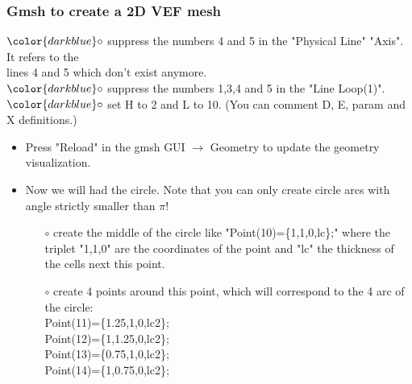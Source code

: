 \documentclass[10pt]{beamer}
\begin{document}
\begin{frame}
\frametitle{Gmsh to create a 2D VEF mesh}
\begin{block}{}

\hspace{1cm} $\color{darkblue}\circ$ {\small{ suppress the numbers 4 and 5 in the "Physical Line" "Axis". It refers to the \\
\hspace{1.4cm} lines 4 and 5 which don't exist anymore.}}\\
\hspace{1cm} $\color{darkblue}\circ$ {\small{ suppress the numbers 1,3,4 and 5 in the "Line Loop(1)".}}\\
\hspace{1cm} $\color{darkblue}\circ$ {\small{ set H to 2 and L to 10. (You can comment D, E, param and X definitions.)}}

\begin{itemize}
\item Press "Reload" in the gmsh GUI $\rightarrow$ Geometry to update the geometry visualization.
\item Now we will had the circle. Note that you can only create circle arcs with angle strictly smaller than $\pi$!
    \begin{itemize}
    \item [$\circ$] create the middle of the circle like "Point(10)=\{1,1,0,lc\};" where the triplet "1,1,0" are the coordinates of the point and "lc" the thickness of the cells next this point.
    \item [$\circ$] create 4 points around this point, which will correspond to the 4 arc of the circle: \\
Point(11)=\{1.25,1,0,lc2\};\\
Point(12)=\{1,1.25,0,lc2\};\\
Point(13)=\{0.75,1,0,lc2\};\\
Point(14)=\{1,0.75,0,lc2\};
    \end{itemize}

\end{itemize}

\end{block}
\end{frame}
\end{document}
